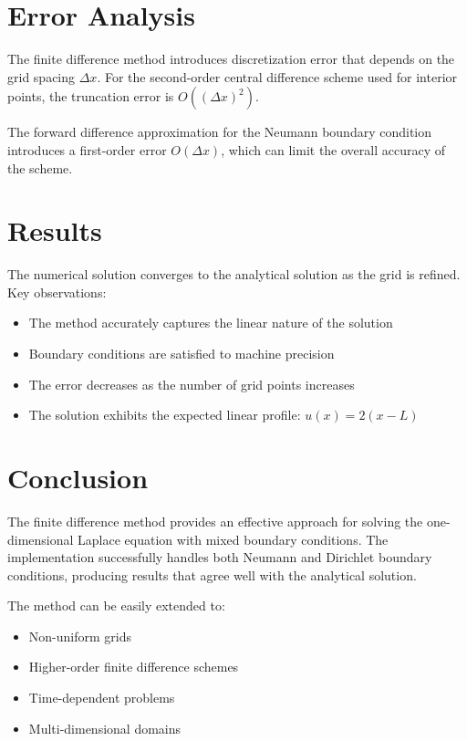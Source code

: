 \documentclass[11pt,a4paper]{article}
\begin{document}
\section{Error Analysis}

The finite difference method introduces discretization error that depends on the grid spacing $\Delta x$. For the second-order central difference scheme used for interior points, the truncation error is $O((\Delta x)^2)$.

The forward difference approximation for the Neumann boundary condition introduces a first-order error $O(\Delta x)$, which can limit the overall accuracy of the scheme.

\section{Results}

The numerical solution converges to the analytical solution as the grid is refined. Key observations:

\begin{itemize}
\item The method accurately captures the linear nature of the solution
\item Boundary conditions are satisfied to machine precision
\item The error decreases as the number of grid points increases
\item The solution exhibits the expected linear profile: $u(x) = 2(x - L)$
\end{itemize}

\section{Conclusion}

The finite difference method provides an effective approach for solving the one-dimensional Laplace equation with mixed boundary conditions. The implementation successfully handles both Neumann and Dirichlet boundary conditions, producing results that agree well with the analytical solution.

The method can be easily extended to:
\begin{itemize}
\item Non-uniform grids
\item Higher-order finite difference schemes
\item Time-dependent problems
\item Multi-dimensional domains
\end{itemize}
\end{document}

